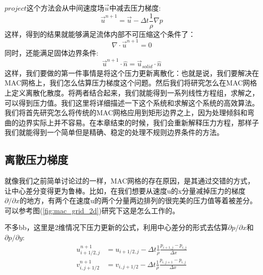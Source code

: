 \documentclass{article}
\begin{document}
$project$这个方法会从中间速度场$\vec{u}$中减去压力梯度:
\begin{equation}
\vec{u}^{n+1}=\vec{u}-\Delta{t}\frac{1}{\rho}\nabla{p}
\end{equation}
这样，得到的结果就能够满足流体内部不可压缩这个条件了：
\begin{equation}
\nabla\cdot{\vec{u}^{n+1}}=0
\end{equation}
同时，还能满足固体边界条件:
\begin{equation}
\vec{u}^{n+1}\cdot{\hat{n}}=\vec{u}_{solid}\cdot{\hat{n}}
\end{equation}
这样，我们要做的第一件事情是将这个压力更新离散化：也就是说，我们要解决在MAC网格上，我们怎么估算压力梯度这个问题。然后我们将研究怎么在MAC网格上定义离散化散度。将两者结合起来，我们就能得到一系列线性方程组，求解之，可以得到压力值。我们这里将详细描述一下这个系统和求解这个系统的高效算法。我们将首先研究怎么将传统的MAC网格应用到矩形边界之上，因为处理倾斜和弯曲的边界实际上并不容易。在本章结束的时候，我们会重新解释压力方程，那样子我们就能得到一个简单但是精确、稳定的处理不规则边界条件的方法。
\subsection{离散压力梯度}
就像我们之前简单讨论过的一样，MAC网格的存在原因，是其通过交错的方式，让中心差分变得更为鲁棒。比如，在我们想要从速度u的x分量减掉压力的梯度$\partial/\partial{x}$的地方，有两个在速度u的两个分量两边排列的很完美的压力值等着被差分。可以参考图(\ref{fig:mac_grid_2d})研究下这是怎么工作的。
\par
不多bb，这里是2维情况下压力更新的公式，利用中心差分的形式去估算$\partial{p}/\partial{x}$和$\partial{p}/\partial{y}$:
\begin{equation}
\begin{aligned}
u_{i+1/2,j}^{n+1}&=u_{i+1/2,j}-\Delta{t}\frac{1}{\rho}\frac{p_{i+1,j}-p_{i,j}}{\Delta{x}} \\
v_{i,j+1/2}^{n+1}&=v_{i,j+1/2}-\Delta{t}\frac{1}{\rho}\frac{p_{i,j+1}-p_{i,j}}{\Delta{x}} \\ \label{2d_pressure_velocity_update}
\end{aligned}
\end{equation}
\end{document}
